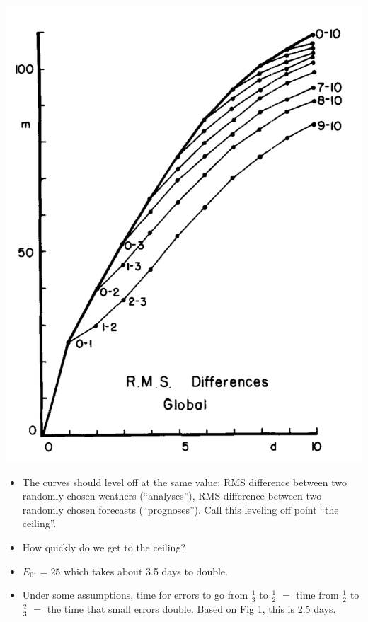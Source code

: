 \documentclass[aspectratio=169]{beamer}
\begin{document}
\begin{frame}

\begin{center}
\includegraphics[height = 0.5\textheight]{figures/lorenz_atmospheric_1982_fig1}
\end{center}

\begin{itemize}
\item The curves should level off at the same value: RMS difference between two randomly chosen weathers (``analyses''), RMS difference between two randomly chosen forecasts (``prognoses'').  Call this leveling off point ``the ceiling''.
\pause
\item How quickly do we get to the ceiling?
\pause
\item $E_{01} = 25$ which takes about 3.5 days to double. 
\pause
\item Under some assumptions, time for errors to go from $\frac{1}{3}$ to $\frac{1}{2}$ $=$ time from $\frac{1}{2}$ to $\frac{2}{3}$ $=$ the time that small errors double. Based on Fig 1, this is 2.5 days.
\end{itemize}

\end{frame}
\end{document}
